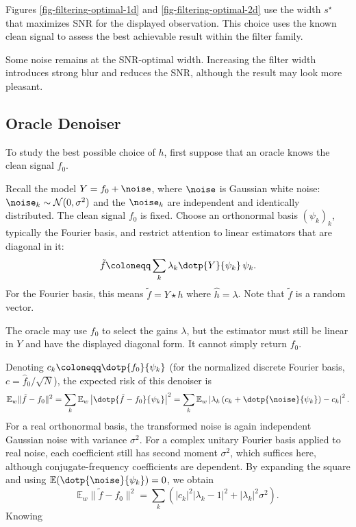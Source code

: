 Figures \ref{fig-filtering-optimal-1d} and \ref{fig-filtering-optimal-2d} use the width $s^\star$ that maximizes SNR for the displayed observation. This choice uses the known clean signal to assess the best achievable result within the filter family.



Some noise remains at the SNR-optimal width. Increasing the filter width introduces strong blur and reduces the SNR, although the result may look more pleasant.


                                                     
\subsection{Oracle Denoiser}

To study the best possible choice of $h$, first suppose that an oracle knows the clean signal $f_0$.
 
Recall the model $Y = f_0 + \noise$, where $\noise$ is Gaussian white noise: $\noise_k \sim \mathcal{N}(0, \sigma^2)$ and the $\noise_k$ are independent and identically distributed. The clean signal $f_0$ is fixed. Choose an orthonormal basis $(\psi_k)_k$, typically the Fourier basis, and restrict attention to linear estimators that are diagonal in it:
\begin{equation}\label{eq:linear-denoiser}
	\tilde{f} \coloneqq \sum_k \lambda_k \dotp{Y}{\psi_k} \, \psi_k.
\end{equation}
For the Fourier basis, this means $\tilde{f} = Y \star h$ where $\hat h=\lambda$. Note that $\tilde{f}$ is a random vector.
 
The oracle may use $f_0$ to select the gains $\lambda$, but the estimator must still be linear in $Y$ and have the displayed diagonal form. It cannot simply return $f_0$.

Denoting $c_k \coloneqq \dotp{f_0}{\psi_k}$ (for the normalized discrete Fourier basis, $c=\hat f_0/\sqrt N$), the expected risk of this denoiser is
$$
	\mathbb{E}_w \|\tilde{f} - f_0\|^2 = \sum_k \mathbb{E}_w \left| \dotp{\tilde{f} - f_0}{\psi_k} \right|^2  = \sum_k \mathbb{E}_w  \left| \lambda_k \left( c_k + \dotp{\noise}{\psi_k} \right) - c_k \right|^2 .
$$
For a real orthonormal basis, the transformed noise is again independent Gaussian noise with variance $\sigma^2$. For a complex unitary Fourier basis applied to real noise, each coefficient still has second moment $\sigma^2$, which suffices here, although conjugate-frequency coefficients are dependent. By expanding the square and using $\mathbb{E}(\dotp{\noise}{\psi_k}) = 0$, we obtain
$$
\mathbb{E}_w  \|\tilde{f} - f_0\|^2  = \sum_k\left(|c_k|^2|\lambda_k-1|^2+|\lambda_k|^2\sigma^2\right) .
$$
Knowing 